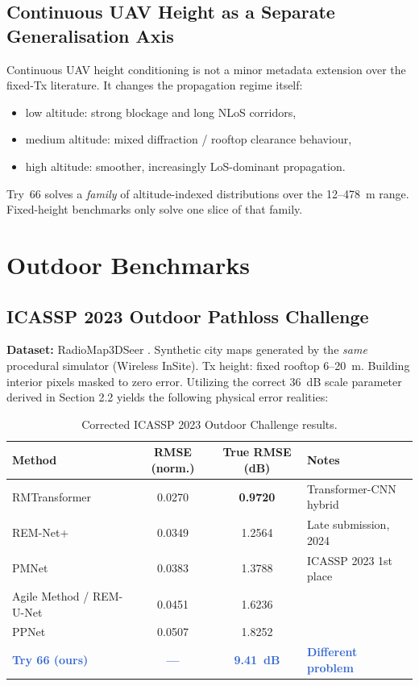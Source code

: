 \documentclass[11pt,a4paper]{article}
\newcommand{\better}[1]{\textcolor{good}{\textbf{#1}}}
\newcommand{\ours}[1]{\textcolor{highlight}{\textbf{#1}}}
\begin{document}
\subsection{Continuous UAV Height as a Separate Generalisation Axis}

Continuous UAV height conditioning is not a minor metadata extension over the
fixed-Tx literature. It changes the propagation regime itself:
\begin{itemize}[nosep]
    \item low altitude: strong blockage and long NLoS corridors,
    \item medium altitude: mixed diffraction / rooftop clearance behaviour,
    \item high altitude: smoother, increasingly LoS-dominant propagation.
\end{itemize}
Try~66 solves a \emph{family} of altitude-indexed distributions over the 12--478~m range.
Fixed-height benchmarks only solve one slice of that family.

\section{Outdoor Benchmarks}
\label{sec:outdoor}

\subsection{ICASSP 2023 Outdoor Pathloss Challenge}
\label{ssec:icassp2023}

\textbf{Dataset:} RadioMap3DSeer \cite{icassp2023challenge}. Synthetic city maps generated by the \emph{same} procedural simulator (Wireless InSite). Tx height: fixed rooftop 6--20~m. Building interior pixels masked to zero error. Utilizing the correct 36~dB scale parameter derived in Section 2.2 yields the following physical error realities:

\begin{table}[h!]
\centering
\caption{Corrected ICASSP 2023 Outdoor Challenge results.}
\label{tab:icassp2023}
\small
\begin{tabular}{lccl}
\toprule
\textbf{Method} & \textbf{RMSE (norm.)} & \textbf{True RMSE (dB)} & \textbf{Notes} \\
\midrule
RMTransformer \cite{rmtransformer2025} & 0.0270 & \better{0.9720} & Transformer-CNN hybrid \\
REM-Net+ \cite{remnet2024} & 0.0349 & 1.2564 & Late submission, 2024 \\
PMNet \cite{pmnet2023} & 0.0383 & 1.3788 & ICASSP 2023 1st place \\
Agile Method / REM-U-Net & 0.0451 & 1.6236 & \\
PPNet & 0.0507 & 1.8252 & \\
\midrule
\ours{Try 66 (ours)} & \ours{---} & \ours{9.41~dB} & \ours{Different problem} \\
\bottomrule
\end{tabular}
\end{table}
\normalsize
\end{document}
